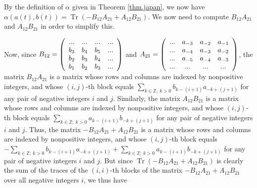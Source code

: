 \documentclass[etingof-lie.tex]{subfiles}
\begin{document}
By the definition of $\alpha$ given in Theorem \ref{thm.japan}, we now have
$\alpha\left(  a\left(  t\right)  ,b\left(  t\right)  \right)
=\operatorname*{Tr}\left(  -B_{12}A_{21}+A_{12}B_{21}\right)  $. We now need
to compute $B_{12}A_{21}$ and $A_{12}B_{21}$ in order to simplify this.

Now, since $B_{12}=\left(
\begin{array}
[c]{cccc}%
... & ... & ... & ...\\
b_{3} & b_{4} & b_{5} & ...\\
b_{2} & b_{3} & b_{4} & ...\\
b_{1} & b_{2} & b_{3} & ...
\end{array}
\right)  $ and $A_{21}=\left(
\begin{array}
[c]{cccc}%
... & a_{-3} & a_{-2} & a_{-1}\\
... & a_{-4} & a_{-3} & a_{-2}\\
... & a_{-5} & a_{-4} & a_{-3}\\
... & ... & ... & ...
\end{array}
\right)  $, the matrix $B_{12}A_{21}$ is a matrix whose rows and columns are
indexed by nonpositive integers, and whose $\left(  i,j\right)  $-th block
equals $\sum\limits_{k\in\mathbb{Z};\ k>0}b_{k-\left(  i+1\right)
}a_{-k+\left(  j+1\right)  }$ for any pair of negative integers $i$ and $j$.
Similarly, the matrix $A_{12}B_{21}$ is a matrix whose rows and columns are
indexed by nonpositive integers, and whose $\left(  i,j\right)  $-th block
equals $\sum\limits_{k\in\mathbb{Z};\ k>0}a_{k-\left(  i+1\right)
}b_{-k+\left(  j+1\right)  }$ for any pair of negative integers $i$ and $j$.
Thus, the matrix $-B_{12}A_{21}+A_{12}B_{21}$ is a matrix whose rows and
columns are indexed by nonpositive integers, and whose $\left(  i,j\right)
$-th block equals $-\sum\limits_{k\in\mathbb{Z};\ k>0}b_{k-\left(  i+1\right)
}a_{-k+\left(  j+1\right)  }+\sum\limits_{k\in\mathbb{Z};\ k>0}a_{k-\left(
i+1\right)  }b_{-k+\left(  j+1\right)  }$ for any pair of negative integers
$i$ and $j$. But since $\operatorname*{Tr}\left(  -B_{12}A_{21}+A_{12}%
B_{21}\right)  $ is clearly the sum of the traces of the $\left(  i,i\right)
$-th blocks of the matrix $-B_{12}A_{21}+A_{12}B_{21}$ over all negative
integers $i$, we thus have%
\end{document}
